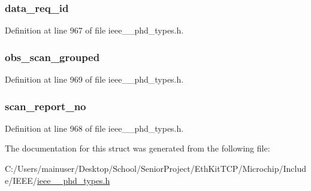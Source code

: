 \subsubsection[{data\+\_\+req\+\_\+id}]{ data\+\_\+req\+\_\+id}\label{struct___scan_report_info_grouped_ad3e167bbeac9d4b94b67cb6966e1f1fb}


Definition at line 967 of file ieee\+\_\+\_\+phd\+\_\+types.\+h.

\hypertarget{struct___scan_report_info_grouped_abff484f3bf062c7efe1ee3ec4b46b2a8}{}
\subsubsection[{obs\+\_\+scan\+\_\+grouped}]{ obs\+\_\+scan\+\_\+grouped}\label{struct___scan_report_info_grouped_abff484f3bf062c7efe1ee3ec4b46b2a8}


Definition at line 969 of file ieee\+\_\+\_\+phd\+\_\+types.\+h.

\hypertarget{struct___scan_report_info_grouped_a21f75132869d4d200ffe01d91b4736d8}{}
\subsubsection[{scan\+\_\+report\+\_\+no}]{ scan\+\_\+report\+\_\+no}\label{struct___scan_report_info_grouped_a21f75132869d4d200ffe01d91b4736d8}


Definition at line 968 of file ieee\+\_\+\_\+phd\+\_\+types.\+h.



The documentation for this struct was generated from the following file\+:\begin{DoxyCompactItemize}
\item 
C\+:/\+Users/mainuser/\+Desktop/\+School/\+Senior\+Project/\+Eth\+Kit\+T\+C\+P/\+Microchip/\+Include/\+I\+E\+E\+E/\hyperlink{ieee__11073__phd__types_8h}{ieee\+\_\+\_\+phd\+\_\+types.\+h}\end{DoxyCompactItemize}
